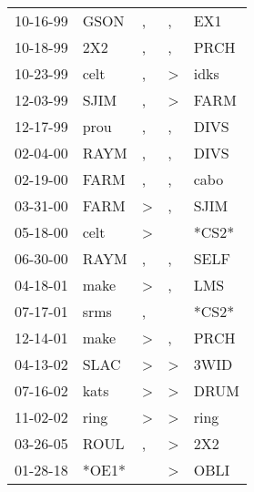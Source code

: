 \begin{supertabular}{lllll}
 10-16-99 &   GSON &             , &             , &    EX1 \\
 10-18-99 &    2X2 &             , &             , &   PRCH \\
 10-23-99 &   celt &             , &  \textgreater &   idks \\
 12-03-99 &   SJIM &             , &  \textgreater &   FARM \\
 12-17-99 &   prou &             , &             , &   DIVS \\
 02-04-00 &   RAYM &             , &             , &   DIVS \\
 02-19-00 &   FARM &             , &             , &   cabo \\
 03-31-00 &   FARM &  \textgreater &             , &   SJIM \\
 05-18-00 &   celt &  \textgreater &               &  *CS2* \\
 06-30-00 &   RAYM &             , &             , &   SELF \\
 04-18-01 &   make &  \textgreater &             , &    LMS \\
 07-17-01 &   srms &             , &               &  *CS2* \\
 12-14-01 &   make &  \textgreater &             , &   PRCH \\
 04-13-02 &   SLAC &  \textgreater &  \textgreater &   3WID \\
 07-16-02 &   kats &  \textgreater &  \textgreater &   DRUM \\
 11-02-02 &   ring &  \textgreater &  \textgreater &   ring \\
 03-26-05 &   ROUL &             , &  \textgreater &    2X2 \\
 01-28-18 &  *OE1* &               &  \textgreater &   OBLI \\
\end{supertabular}
